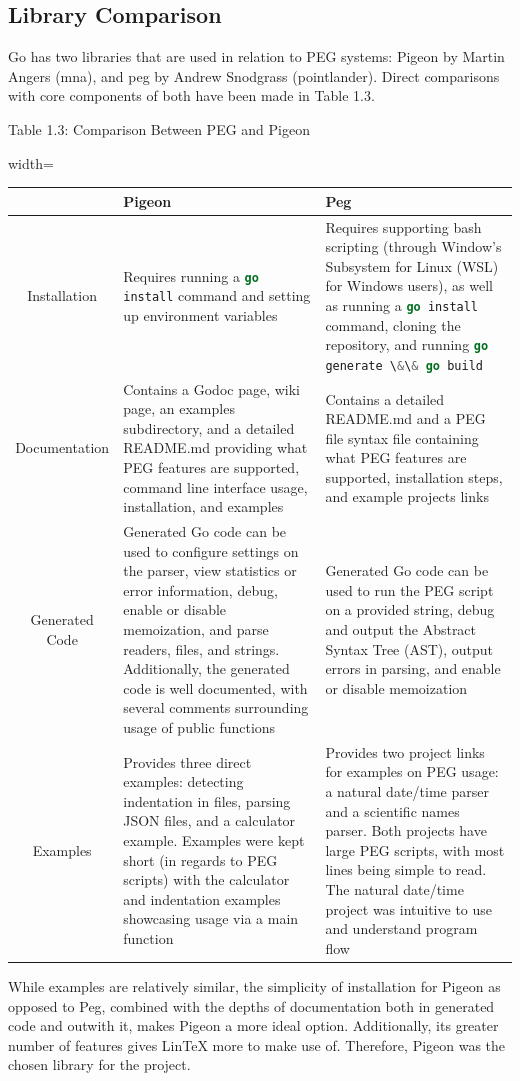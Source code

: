 \documentclass[11pt,titlepage,dvipsnames,table,xcdraw]{article}
\begin{document}
\subsection{Library Comparison}
Go has two libraries that are used in relation to PEG systems: Pigeon by Martin Angers (mna), and peg by Andrew Snodgrass (pointlander). Direct comparisons with core components of both have been made in Table 1.3.
\begin{center}
Table 1.3: Comparison Between PEG and Pigeon
\begin{adjustbox}{width=\textwidth}
\begin{tabular}{ c | p{100mm} p{100mm}}
& Pigeon & Peg \\
\hline
Installation & Requires running a \lstinline[language=Go]!go install! command and setting up environment variables & Requires supporting bash scripting (through Window's Subsystem for Linux (WSL) for Windows users), as well as running a \lstinline[language=Go]!go install! command, cloning the repository, and running \lstinline[language=Go]!go generate \&\& go build! \\
Documentation & Contains a Godoc page, wiki page, an examples subdirectory, and a detailed README.md providing what PEG features are supported, command line interface usage, installation, and examples & Contains a detailed README.md and a PEG file syntax file containing what PEG features are supported, installation steps, and example projects links \\
Generated Code & Generated Go code can be used to configure settings on the parser, view statistics or error information, debug, enable or disable memoization, and parse readers, files, and strings. Additionally, the generated code is well documented, with several comments surrounding usage of public functions & Generated Go code can be used to run the PEG script on a provided string, debug and output the Abstract Syntax Tree (AST), output errors in parsing, and enable or disable memoization \\
Examples & Provides three direct examples: detecting indentation in files, parsing JSON files, and a calculator example. Examples were kept short (in regards to PEG scripts) with the calculator and indentation examples showcasing usage via a main function & Provides two project links for examples on PEG usage: a natural date/time parser and a scientific names parser. Both projects have large PEG scripts, with most lines being simple to read. The natural date/time project was intuitive to use and understand program flow \\
\end{tabular}
\end{adjustbox}
\end{center}
While examples are relatively similar, the simplicity of installation for Pigeon as opposed to Peg, combined with the depths of documentation both in generated code and outwith it, makes Pigeon a more ideal option. Additionally, its greater number of features gives LinTeX more to make use of. Therefore, Pigeon was the chosen library for the project.
\end{document}
